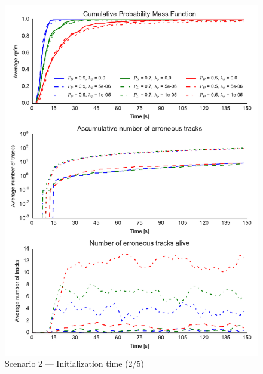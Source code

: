 \begin{figure}
\centering
\includegraphics{Figures/plots/Scenario2_Init-Time(2-5).pdf}
\caption{Scenario 2 --- Initialization time (2/5)}\label{fig:init2_time_2-5}
\end{figure}

